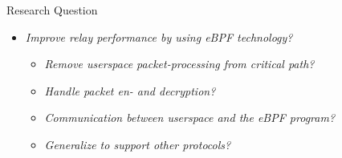 \documentclass[shortpres,aspectratio=43]{beamer}
\newlength{\mylength}
\begin{document}

\begin{frame}{Research Question}
    \begin{itemize}
        \item \textit{Improve relay performance by using eBPF technology?}
        \vspace{2\mylength}
        \begin{itemize}
            \item \textit{Remove userspace packet-processing from critical path?}
            \vspace{2\mylength}
            \item \textit{Handle packet en- and decryption?}
            \vspace{2\mylength}
            \item \textit{Communication between userspace and the eBPF program?}
            \vspace{2\mylength}
            \item \textit{Generalize to support other protocols?}
        \end{itemize}
    \end{itemize}
\end{frame}
\end{document}
